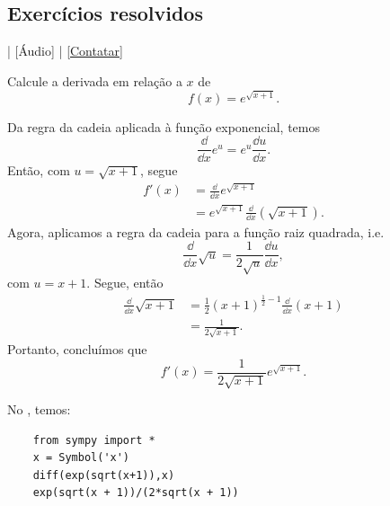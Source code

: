 \subsection*{Exercícios resolvidos}

\begin{flushright}
  [Vídeo] | [Áudio] | \href{https://phkonzen.github.io/notas/contato.html}{[Contatar]}
\end{flushright}

\begin{exeresol}
  Calcule a derivada em relação a $x$ de
  \begin{equation}
    f(x) = e^{\sqrt{x+1}}.
  \end{equation}
\end{exeresol}
\begin{resol}
  Da regra da cadeia aplicada à função exponencial, temos
  \begin{equation}
    \frac{\dd}{\dd x}e^u = e^u\frac{\dd u}{\dd x}.
  \end{equation}
  Então, com $u = \sqrt{x+1}$, segue
  \begin{align}
    f'(x) &= \frac{\dd}{\dd x}e^{\sqrt{x+1}} \\
          &= e^{\sqrt{x+1}}\frac{\dd}{\dd x}\left(\sqrt{x+1}\right).
  \end{align}
  Agora, aplicamos a regra da cadeia para a função raiz quadrada, i.e.
  \begin{equation}
    \frac{\dd}{\dd x}\sqrt{u} = \frac{1}{2\sqrt{u}}\frac{\dd u}{\dd x},
  \end{equation}
  com $u = x+1$. Segue, então
  \begin{align}
    \frac{\dd}{\dd x}\sqrt{x+1} &= \frac{1}{2}(x+1)^{\frac{1}{2}-1}\frac{\dd}{\dd x}(x+1) \\
                                &= \frac{1}{2\sqrt{x+1}}.
  \end{align}
  Portanto, concluímos que
  \begin{equation}
    f'(x) = \frac{1}{2\sqrt{x+1}}e^{\sqrt{x+1}}.
  \end{equation}

  \ifispython
  No \sympy, temos:
  \begin{lstlisting}
    from sympy import *
    x = Symbol('x')
    diff(exp(sqrt(x+1)),x)
    exp(sqrt(x + 1))/(2*sqrt(x + 1))
  \end{lstlisting}
  \fi  
\end{resol}

